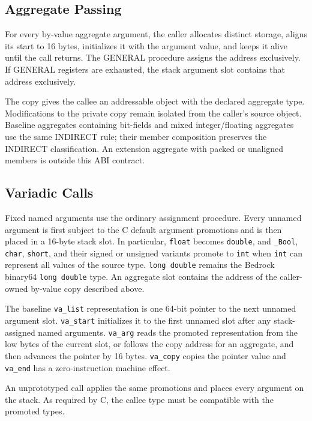 \documentclass[10pt,twoside]{article}
\begin{document}
\BedrockGeneratedCReturnRegisterTable

\subsection{Aggregate Passing}
For every by-value aggregate argument, the caller allocates distinct storage,
aligns its start to 16 bytes, initializes it with the argument value, and keeps
it alive until the call returns. The GENERAL procedure assigns the address
exclusively. If GENERAL registers are exhausted, the
stack argument slot contains that address exclusively.

The copy gives the callee an addressable object with the declared aggregate
type. Modifications to the private copy remain isolated from the caller's
source object. Baseline aggregates containing bit-fields and mixed
integer/floating aggregates use the same INDIRECT rule; their member
composition preserves the INDIRECT classification. An extension aggregate with
packed or unaligned members is outside this ABI contract.

\subsection{Variadic Calls}
Fixed named arguments use the ordinary assignment procedure. Every unnamed
argument is first subject to the C default argument promotions and is then
placed in a 16-byte stack slot. In particular, \texttt{float} becomes
\texttt{double}, and \texttt{\_Bool}, \texttt{char}, \texttt{short}, and their
signed or unsigned variants promote to \texttt{int} when \texttt{int} can
represent all values of the source type. \texttt{long double} remains the
Bedrock binary64 \texttt{long double} type. An aggregate slot contains the
address of the caller-owned by-value copy described above.

The baseline \texttt{va\_list} representation is one 64-bit pointer to the next
unnamed argument slot. \texttt{va\_start} initializes it to the first unnamed
slot after any stack-assigned named arguments. \texttt{va\_arg} reads the
promoted representation from the low bytes of the current slot, or follows the
copy address for an aggregate, and then advances the pointer by 16 bytes.
\texttt{va\_copy} copies the pointer value and \texttt{va\_end} has a
zero-instruction machine effect.

An unprototyped call applies the same promotions and places every argument on
the stack. As required by C, the callee type must be compatible with the
promoted types.
\end{document}
